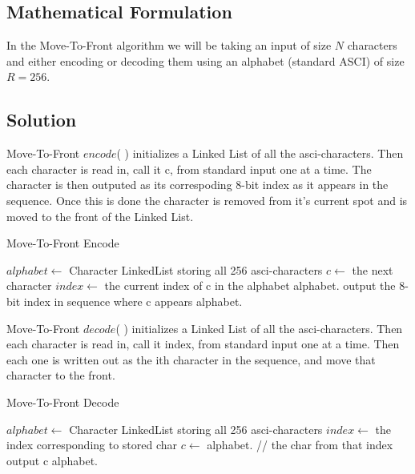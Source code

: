 \documentclass[12pt]{article}
\begin{document}


\subsection{Mathematical Formulation}
In the Move-To-Front algorithm we will be taking an input of size $N$ characters and either
encoding or decoding them using an alphabet (standard ASCI) of size $R = 256$.


\subsection{Solution}
Move-To-Front $encode$( ) initializes a Linked List of all the asci-characters.
Then each character is read in, call it c, from standard input one at a time.
The character is then outputed as its correspoding 8-bit index as it appears in
the sequence. Once this is done the character is removed from it's current spot
and is moved to the front of the Linked List.

\begin{algorithm}[H]
\caption{Move-To-Front Encode}
\begin{algorithmic}
        \State $alphabet \gets$ Character LinkedList storing all 256 asci-characters
            \State $c \gets$ the next character
            \State $index \gets$ the current index of c in the alphabet
            \State alphabet.
            \State output the 8-bit index in sequence where c appears
            \State alphabet.
        \EndWhile
    \EndProcedure
\end{algorithmic}
\end{algorithm}

\noindent Move-To-Front $decode$( ) initializes a Linked List of all the asci-characters.
Then each character is read in, call it index, from standard input one at a time. Then
each one is written out as the ith character in the sequence, and move that character
to the front.

\begin{algorithm}[H]
\caption{Move-To-Front Decode}
\begin{algorithmic}
        \State $alphabet \gets$ Character LinkedList storing all 256 asci-characters
            \State $index \gets$ the index corresponding to stored char
            \State $c \gets$ alphabet. // the char from that index
            \State output c
            \State alphabet.
        \EndWhile
    \EndProcedure
\end{algorithmic}
\end{algorithm}
\end{document}
